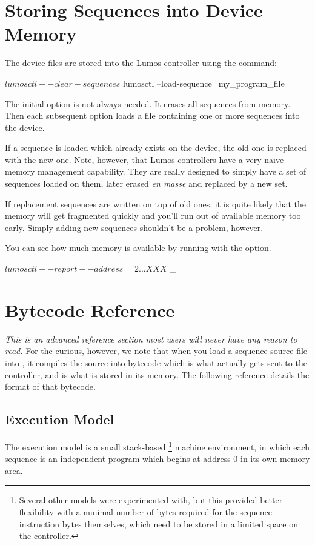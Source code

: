 \documentclass[letterpaper,twoside,onecolumn,openright,final]{memoir}
\begin{document}
{\section{Storing Sequences into Device Memory}
The device files are stored into the Lumos controller using the  command:
\begin{SourceCode}
$ lumosctl --clear-sequences
$ lumosctl --load-sequence=my_program_file
\end{SourceCode}

The initial  option is not always needed.  It erases all sequences
from memory.  Then each subsequent  option loads a file containing one
or more sequences into the device.

If a sequence is loaded which already exists on the device, the old one is replaced with the
new one.  Note, however, that Lumos controllers have a very na\"\i ve memory management capability.
They are really designed to simply have a set of sequences loaded on them, later erased
\emph{en masse} and replaced by a new set.

If replacement sequences are written on top of old ones, it is quite likely that the memory
will get fragmented quickly and you'll run out of available memory too early.
Simply adding new sequences shouldn't be a problem, however.

You can see how much memory is available by running  with the  
option.
\begin{SourceCode}
$ lumosctl --report --address=2
...
XXX
$ _
\end{SourceCode}

\section{Bytecode Reference}\label{sec:bytecode}
\emph{This is an advanced reference section most users will never have any reason to 
read.}  For the curious, however, we note that when you load a sequence source file
into , it compiles the source into bytecode which is what actually gets 
sent to the controller, and is what is stored in its memory.  The following reference
details the format of that bytecode.

\subsection{Execution Model}
The execution model is a small stack-based 
\footnote{Several other
models were experimented with, but this provided better flexibility with a minimal
number of bytes required for the sequence instruction bytes themselves, which need to
be stored in a limited space on the controller.} 
machine environment, in which
each sequence is an independent program which begins at
address 0 in its own memory area.  

}
\end{document}
